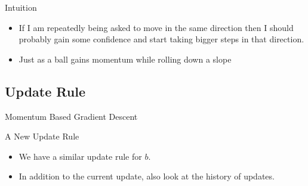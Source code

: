 \documentclass[10pt, aspectratio=169]{beamer}
\begin{document}
\begin{frame}
\begin{block}{Intuition}

\begin{itemize}
\item<1-> If I am repeatedly being asked to move in the same direction then I should probably gain some confidence and start taking bigger steps in that direction.
\item<2-> Just as a ball gains momentum while rolling down a slope
\end{itemize}
\end{block}
\end{frame}

\subsection{Update Rule}

\begin{frame}{Momentum Based Gradient Descent}
\begin{block}{A New Update Rule}

\begin{itemize}
\item<2-> We have a similar update rule for $b$.
\item<3-> In addition to the current update, also look at the history of updates.
\end{itemize}

\end{block}
\end{frame}
\end{document}
